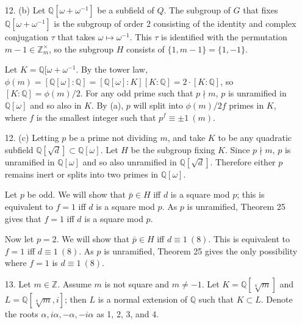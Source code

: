 \documentclass{article}
\newcommand{\w}[0]{\omega}
\newcommand{\Q}[0]{\mathbb{Q}}
\newcommand{\Z}[0]{\mathbb{Z}}
\newcommand{\modequiv}[3]{#1 \equiv #2\ (#3)}
\begin{document}
\begin{enumerate}
Let $H\overline{a_1}, \ldots, H\overline{a_n}$ be the cosets of $H$ (with $\overline{a_1}$ being the permutation that takes $\w \mapsto \w^{a_1}$).

Let the cyclic group $\{1, p, p^2, \ldots, p^{f-1} \}$ (with $p^{f} = 1$) act on the right cosets of $H$.  For any coset $Hx$, $p^{a}(Hx) = Hxp^{a}$; if $xp^{a} = x$ then $\w^{xp^{a}} = \w^{x}$ and so $\modequiv{xp^{a}}{x}{m}$.  Therefore $\modequiv{p^a}{1}{m}$; as $p \nmid m$, $a = 0$.  By the orbit stabilizer theorem, the size of an orbit of $Hx$ is the size of the whole group, i.e. $f$, by Theorem 33 the inertial degree of any prime $P$ of $K$ lying over $p$ is $f$.

\item [12. (b)] Let $\Q[\w + \w^{-1}]$ be a subfield of $Q$.  The subgroup of $G$ that fixes $\Q[\w + \w^{-1}]$ is the subgroup of order 2 consisting of the identity and complex conjugation $\tau$ that takes $\omega \mapsto \omega^{-1}$.  This $\tau$ is identified with the permutation $m - 1 \in \Z^{\times}_{m}$, so the subgroup $H$ consists of $\{1, m - 1 \} = \{1, -1 \}$.

Let $K = \Q[\w + \w^{-1}$.  By the tower law, $\phi(m) = [\Q[\w] : \Q] = [\Q[\w] : K][K : \Q] = 2 \cdot[K : \Q]$, so $[K : \Q] = \phi(m) / 2$.  For any odd prime such that $p \nmid m$, $p$ is unramified in $\Q[\w]$ and so also in $K$.  By (a), $p$ will split into $\phi(m) / 2f$ primes in $K$, where $f$ is the smallest integer such that $\modequiv{p^f}{\pm 1}{m}$.

\item [12. (c)] Letting $p$ be a prime not dividing $m$, and take $K$ to be any quadratic subfield $\Q[\sqrt{d}] \subset \Q[\w]$.  Let $H$ be the subgroup fixing $K$. Since $p \nmid m$, $p$ is unramified in $\Q[\w]$ and so also unramified in $\Q[\sqrt{d}]$.  Therefore either $p$ remains inert or splits into two primes in $\Q[\w]$.

Let $p$ be odd. We will show that $\bar{p} \in H$ iff $d$ is a square mod $p$; this is equivalent to $f = 1$ iff $d$ is a square mod $p$.  As $p$ is unramified, Theorem 25 gives that $f = 1$ iff $d$ is a square mod $p$.

Now let $p = 2$.  We will show that $\bar{p} \in H$ iff $\modequiv{d}{1}{8}$.  This is equivalent to $f = 1$ iff $\modequiv{d}{1}{8}$.  As $p$ is unramified, Theorem 25 gives the only possibility where $f = 1$ is $\modequiv{d}{1}{8}$.

\item [13.] Let $m \in \Z$.  Assume $m$ is not square and $m \neq -1$.  Let $K = \Q[\sqrt[4]{m}]$ and $L = \Q[\sqrt[4]{m}, i]$; then $L$ is a normal extension of $\Q$ such that $K \subset L$.  Denote the roots $\alpha, i\alpha, -\alpha, -i\alpha$ as 1, 2, 3, and 4.


\end{enumerate}
\end{document}
